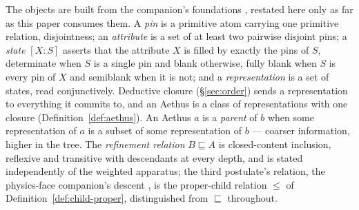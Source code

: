 The objects are built from the companion's foundations \cite{Aethus}, restated here only as far as this paper consumes them. A \emph{pin} is a primitive atom carrying one primitive relation, disjointness; an \emph{attribute} is a set of at least two pairwise disjoint pins; a \emph{state} $[X : S]$ asserts that the attribute $X$ is filled by exactly the pins of $S$, determinate when $S$ is a single pin and blank otherwise, fully blank when $S$ is every pin of $X$ and semiblank when it is not; and a \emph{representation} is a set of states, read conjunctively. Deductive closure (§\ref{sec:order}) sends a representation to everything it commits to, and an Aethus is a class of representations with one closure (Definition~\ref{def:aethus}). An Aethus $a$ is a \emph{parent} of $b$ when some representation of $a$ is a subset of some representation of $b$ --- coarser information, higher in the tree. The \emph{refinement relation} $B \sqsubseteq A$ is closed-content inclusion, reflexive and transitive with descendants at every depth, and is stated independently of the weighted apparatus; the third postulate's relation, the physics-face companion's descent \cite{AethusQuant}, is the proper-child relation $\le$ of Definition~\ref{def:child-proper}, distinguished from $\sqsubseteq$ throughout.

